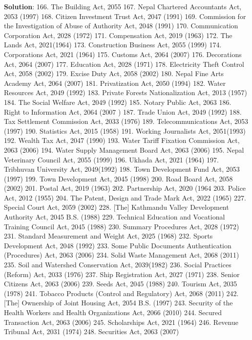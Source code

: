 \documentclass[
  openany]{book}
\newenvironment{solution}{ {\bfseries Solution}:}{}
\begin{document}
\begin{questions}
\begin{solution}
166. The Building Act, 2055
167. Nepal Chartered Accountants Act, 2053 (1997)
168. Citizen Investment Trust Act, 2047 (1991)
169. Commission for the Investigation of Abuse of Authority Act, 2048 (1991)
170. Communication Corporation Act, 2028 (1972)
171. Compensation Act, 2019 (1963)
172. The Lands Act, 2021(1964)
173. Construction Business Act, 2055 (1999)
174. Corporations Act, 2021 (1964)
175. Customs Act, 2064 (2007)
176. Decorations Act, 2064 (2007)
177. Education Act, 2028 (1971)
178. Electricity Theft Control Act, 2058 (2002)
179. Excise Duty Act, 2058 (2002)
180. Nepal Fine Arts Academy Act, 2064 (2007)
181. Privatization Act, 2050 (1994)
182. Water Resources Act, 2049 (1992)
183. Private Forests Nationalization Act, 2013 (1957)
184. The Social Welfare Act, 2049 (1992)
185. Notary Public Act, 2063
186. Right to Information Act, 2064 (2007 )
187. Trade Union Act, 2049 (1992)
188. Tax Settlement Commission Act, 2033 (1976)
189. Telecommunications Act, 2053 (1997)
190. Statistics Act, 2015 (1958)
191. Working Journalists Act, 2051(1993)
192. Wealth Tax Act, 2047 (1990)
193. Water Tariff Fixation Commission Act, 2063 (2006)
194. Water Supply Management Board Act, 2063 (2006)
195. Nepal Veterinary Council Act, 2055 (1999)
196. Ukhada Act, 2021 (1964)
197. Tribhuvan University Act, 2049(1992)
198. Town Development Fund Act, 2053 (1997)
199. Town Development Act, 2045 (1998)
200. Road Board Act, 2058 (2002)
201. Postal Act, 2019 (1963)
202. Partnership Act, 2020 (1964
203. Police Act, 2012 (1955)
204. The Patent, Design and Trade Mark Act, 2022 (1965)
227. Special Court Act, 2059 (2002)
228. [The] Kathmandu Valley Development Authority Act, 2045 B.S. (1988)
229. Technical Education and Vocational Training Council Act, 2045 (1988)
230. Summary Procedures Act, 2028 (1972)
231. Standard Measurement and Weight Act, 2025 (1968)
232. Sports Development Act, 2048 (1992)
233. Some Public Documents Authentication (Procedures) Act, 2063 (2006)
234. Solid Waste Management Act, 2068 (2011)
235. Soil and Watershed Conservation Act, 2039(1982)
236. Social Practices (Reform) Act, 2033 (1976)
237. Ship Registration Act, 2027 (1971)
238. Senior Citizens Act, 2063 (2006)
239. Seeds Act, 2045 (1988)
240. Tourism Act, 2035 (1978)
241. Tobacco Products (Control and Regulatory) Act, 2068 (2011)
242. [The] Ownership of Joint Housing Act, 2054 B.S. (1997)
243. Security of the Health Workers and Health Organizations Act, 2066 (2010)
244. Secured Transaction Act, 2063 (2006)
245. Scholarships Act, 2021 (1964)
246. Revenue Tribunal Act, 2031 (1974)
248. Securities Act, 2063 (2007)

\end{solution}
\end{questions}
\end{document}
